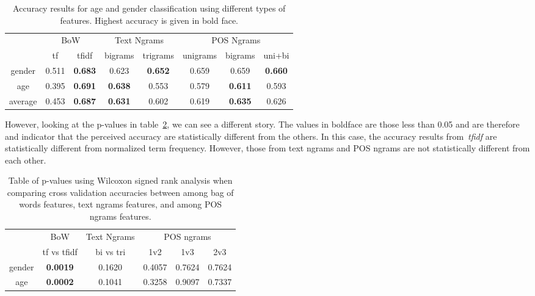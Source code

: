 \documentclass[a4paper]{llncs}
\begin{document}
\begin{table}[!htbp]
\centering
\begin{tabular}{|c|cc|cc|ccc|}
\hline
\multicolumn{1}{|l|}{\multirow{2}{*}{}} & \multicolumn{2}{c|}{BoW} & \multicolumn{2}{c|}{Text Ngrams} & \multicolumn{3}{c|}{POS Ngrams}    \\ \cline{2-8} 
\multicolumn{1}{|l|}{}                  & tf     & tfidf           & bigrams        & trigrams        & unigrams & bigrams        & uni+bi \\ \hline
gender                                  & 0.511  & \textbf{0.683}           & 0.623          & \textbf{0.652}           & 0.659    & 0.659          & \textbf{0.660}  \\ 
age                                     & 0.395  & \textbf{0.691}           & \textbf{0.638}          & 0.553           & 0.579    & \textbf{0.611}          & 0.593  \\ \hline
average                                 & 0.453  & \textbf{0.687}  & \textbf{0.631}          & 0.602           & 0.619    & \textbf{0.635} & 0.626  \\ \hline
\end{tabular}
\caption{Accuracy results for age and gender classification using different types of features. Highest accuracy is given in bold face.}
\label{table:DiffFeaturesResults}
\end{table}

However, looking at the p-values in table~\ref{table:PValDiffFeaturesResults}, we can see a different story. The values in boldface are those less than 0.05 and are therefore and indicator that the perceived accuracy are statistically different from the others. In this case, the accuracy results from~\textit{tfidf} are statistically different from normalized term frequency. However, those from text ngrams and POS ngrams are not statistically different from each other. 

\begin{table}[!htbp]
\centering
\begin{tabular}{|l|c|c|ccc|}
\hline
\multirow{2}{*}{}            & BoW             & Text Ngrams & \multicolumn{3}{c|}{POS ngrams} \\ \cline{2-6} 
                             & tf vs tfidf     & bi vs tri   & 1v2       & 1v3      & 2v3      \\ \hline
\multicolumn{1}{|c|}{gender} & \textbf{0.0019} & 0.1620      & 0.4057    & 0.7624   & 0.7624   \\ \hline
\multicolumn{1}{|c|}{age}    & \textbf{0.0002} & 0.1041      & 0.3258    & 0.9097   & 0.7337   \\ \hline
\end{tabular}
\caption{Table of p-values using Wilcoxon signed rank analysis when comparing cross
validation accuracies between among bag of words features, text ngrams features, and among POS ngrams features.}
\label{table:PValDiffFeaturesResults}
\end{table}
\end{document}
